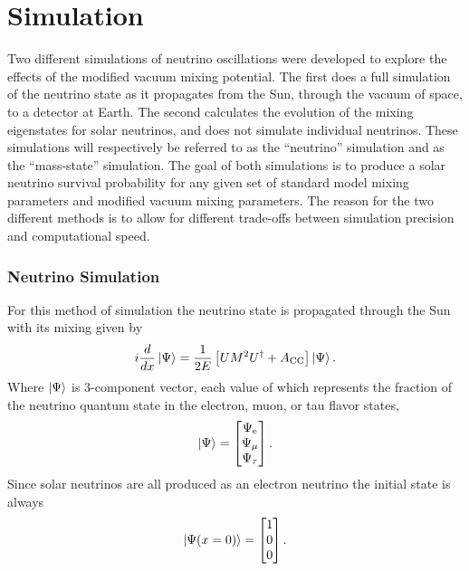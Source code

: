 \chapter{Simulation}
\label{sec:cham_sim}
Two different simulations of neutrino oscillations were developed to explore the
effects of the modified vacuum mixing potential.
The first
does a full simulation of the neutrino state as it propagates from the
Sun, through the vacuum of space, to a detector at Earth.
The second calculates the evolution
of the mixing eigenstates for solar neutrinos, and does not simulate individual
neutrinos.
These simulations will respectively be referred to as the ``neutrino'' simulation
and as the ``mass-state'' simulation.
The goal of both simulations is to produce a solar neutrino survival probability
for any given set of standard model mixing parameters and modified vacuum
mixing parameters.
The reason for the two different methods is to allow for different
trade-offs between simulation precision and computational speed.

\subsection{Neutrino Simulation}
For this method of simulation the neutrino state is propagated through the
Sun with its mixing given by
\begin{equation}
    i\frac{d}{dx}\ket{\Psi} =\frac{1}{2E}\left[UM^{2}U^{\dagger} + A_{\mathrm{CC}}\right]\ket{\Psi}\text{.}
    \label{eqn:mixing_schrodinger}
\end{equation}
Where $\ket{\Psi}$ is 3-component vector, each value of which represents
the fraction of the neutrino quantum state in the electron, muon, or tau flavor states,
\begin{equation}
\ket{\Psi} = 
\begin{bmatrix}
    \Psi_{\mathrm{e}}\\
    \Psi_{\mathrm{\mu}}\\
    \Psi_{\mathrm{\tau}}\\
\end{bmatrix}\mathrm{.}
\end{equation}
Since solar neutrinos are all produced as an electron neutrino the
initial state is always
\begin{equation}
\ket{\Psi(x=0)} = 
\begin{bmatrix}
1\\
0\\
0\\
\end{bmatrix}\mathrm{.}
\end{equation}

